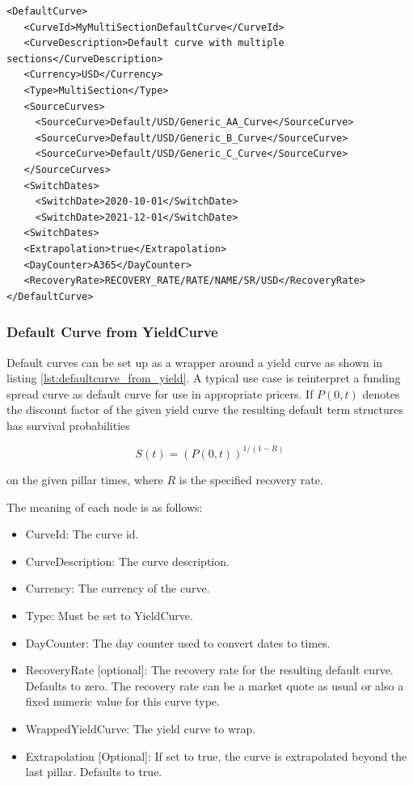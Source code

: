 \begin{longlisting}
\begin{verbatim}
<DefaultCurve>
   <CurveId>MyMultiSectionDefaultCurve</CurveId>
   <CurveDescription>Default curve with multiple sections</CurveDescription>
   <Currency>USD</Currency>
   <Type>MultiSection</Type>
   <SourceCurves>
     <SourceCurve>Default/USD/Generic_AA_Curve</SourceCurve>
     <SourceCurve>Default/USD/Generic_B_Curve</SourceCurve>
     <SourceCurve>Default/USD/Generic_C_Curve</SourceCurve>
   </SourceCurves>
   <SwitchDates>
     <SwitchDate>2020-10-01</SwitchDate>
     <SwitchDate>2021-12-01</SwitchDate>
   <SwitchDates>
   <Extrapolation>true</Extrapolation>
   <DayCounter>A365</DayCounter>
   <RecoveryRate>RECOVERY_RATE/RATE/NAME/SR/USD</RecoveryRate>
</DefaultCurve>
\end{verbatim}
\caption{Multi-Section default curve}
\label{lst:defaultcurve_multisection}
\end{longlisting}

\subsubsection{Default Curve from YieldCurve}\label{ss:default_curve_from_yield_curve}

Default curves can be set up as a wrapper around a yield curve as shown in listing
\ref{lst:defaultcurve_from_yield}. A typical use case is reinterpret a funding spread curve as default curve for use in appropriate pricers.
If $P(0,t)$ denotes the discount factor of the given yield curve the resulting default term structures has survival probabilities

\begin{equation}
S(t) = \left( P(0,t)\right) ^ { 1/(1-R) }
\end{equation}

on the given pillar times, where $R$ is the specified recovery rate.

The meaning of each node is as follows:

\begin{itemize}
\item CurveId: The curve id.
\item CurveDescription: The curve description.
\item Currency: The currency of the curve.
\item Type: Must be set to YieldCurve.
\item DayCounter: The day counter used to convert dates to times.
\item RecoveryRate [optional]: The recovery rate for the resulting default curve. Defaults to zero. The recovery rate
  can be a market quote as usual or also a fixed numeric value for this curve type.
\item WrappedYieldCurve: The yield curve to wrap.
\item Extrapolation [Optional]: If set to true, the curve is extrapolated beyond the last pillar. Defaults to true.
\end{itemize}

